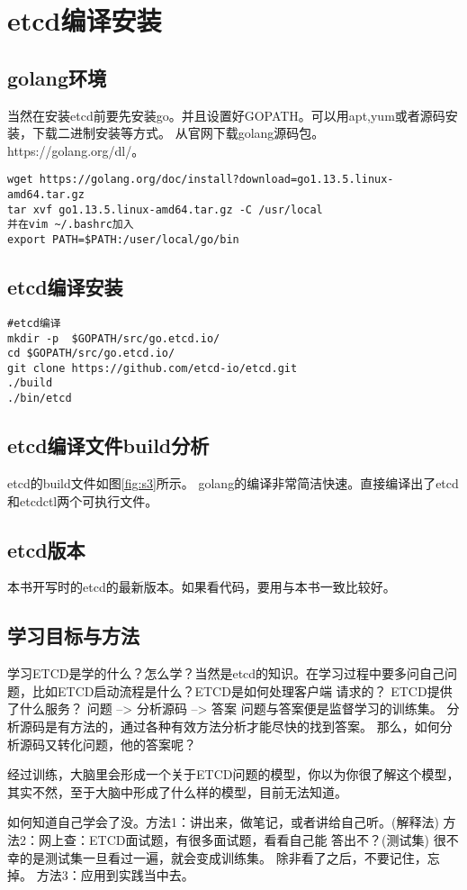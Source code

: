 
\mylineskip
\chapter{etcd编译安装}\label{chaper:ch1}
\section{golang环境}
当然在安装etcd前要先安装go。并且设置好GOPATH。可以用apt,yum或者源码安装，下载二进制安装等方式。
从官网下载golang源码包。https://golang.org/dl/。

\begin{verbatim}
wget https://golang.org/doc/install?download=go1.13.5.linux-amd64.tar.gz
tar xvf go1.13.5.linux-amd64.tar.gz -C /usr/local
并在vim ~/.bashrc加入
export PATH=$PATH:/user/local/go/bin
\end{verbatim}


\section{etcd编译安装}
\begin{verbatim}
#etcd编译
mkdir -p  $GOPATH/src/go.etcd.io/
cd $GOPATH/src/go.etcd.io/
git clone https://github.com/etcd-io/etcd.git
./build
./bin/etcd
\end{verbatim}


\section{etcd编译文件build分析}
	etcd的build文件如图\ref{fig:s3}所示。 golang的编译非常简洁快速。直接编译出了etcd和etcdctl两个可执行文件。


\section{etcd版本}
	本书开写时的etcd的最新版本。如果看代码，要用与本书一致比较好。

\section{学习目标与方法}
学习ETCD是学的什么？怎么学？当然是etcd的知识。在学习过程中要多问自己问题，比如ETCD启动流程是什么？ETCD是如何处理客户端
请求的？ ETCD提供了什么服务？
问题 --> 分析源码 --> 答案
问题与答案便是监督学习的训练集。 分析源码是有方法的，通过各种有效方法分析才能尽快的找到答案。
那么，如何分析源码又转化问题，他的答案呢？

经过训练，大脑里会形成一个关于ETCD问题的模型，你以为你很了解这个模型，其实不然，至于大脑中形成了什么样的模型，目前无法知道。


如何知道自己学会了没。方法1：讲出来，做笔记，或者讲给自己听。(解释法) 方法2：网上查：ETCD面试题，有很多面试题，看看自己能
答出不？(测试集) 很不幸的是测试集一旦看过一遍，就会变成训练集。 除非看了之后，不要记住，忘掉。 方法3：应用到实践当中去。
